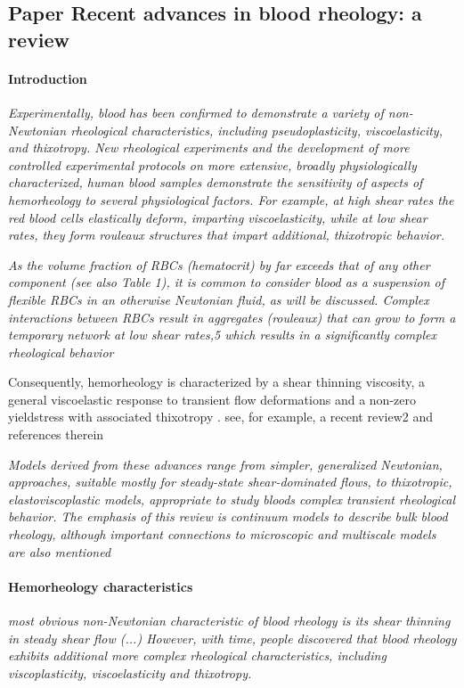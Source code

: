 \documentclass[11pt,letterpaper]{article}
\begin{document}
\newpage
\subsection{Paper Recent advances in blood rheology: a review}

\paragraph{Introduction}
\textit{Experimentally, blood has been confirmed to demonstrate a variety of non-Newtonian rheological characteristics, including pseudoplasticity, viscoelasticity, and thixotropy. New rheological experiments and the development of more controlled experimental protocols on more extensive, broadly physiologically characterized, human blood samples demonstrate the sensitivity of aspects of hemorheology to several physiological factors. For example, at high shear rates the red blood cells elastically deform, imparting viscoelasticity, while at low shear rates, they form rouleaux structures that impart additional, thixotropic behavior.}

\textit{As the volume fraction of RBCs (hematocrit) by far exceeds that of any other component (see also Table 1), it is common to consider blood as a suspension of flexible RBCs in an otherwise Newtonian fluid, as will be discussed. Complex interactions between RBCs result in aggregates (rouleaux) that can grow to form a temporary network at low shear rates,5 which results in a significantly complex rheological behavior}


{\color{red} Consequently, hemorheology is characterized by a shear thinning viscosity, a general viscoelastic response to transient flow deformations and a non-zero yieldstress with associated
thixotropy . see, for example, a recent review2 and references therein}


\textit{Models derived from these advances range from simpler, generalized Newtonian, approaches, suitable mostly for steady-state shear-dominated flows, to thixotropic, elastoviscoplastic models, appropriate to study bloods complex transient rheological behavior. The emphasis of this review is continuum models to describe bulk blood rheology, although important connections to microscopic and multiscale models are also mentioned}

\paragraph{Hemorheology characteristics}
\textit{most obvious non-Newtonian characteristic of blood rheology is its shear thinning in steady shear flow (...) However, with time, people discovered that blood rheology exhibits additional more complex rheological characteristics, including viscoplasticity, viscoelasticity and thixotropy. }
\end{document}
